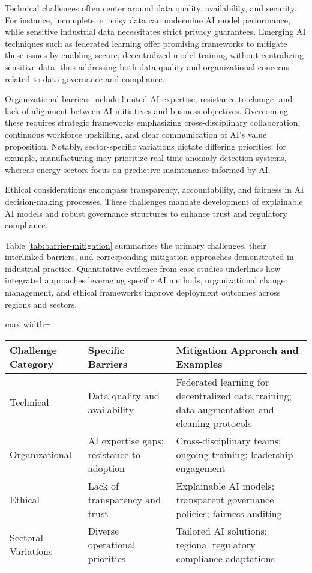 \documentclass[sigconf]{acmart}
\begin{document}
Technical challenges often center around data quality, availability, and security. For instance, incomplete or noisy data can undermine AI model performance, while sensitive industrial data necessitates strict privacy guarantees. Emerging AI techniques such as federated learning offer promising frameworks to mitigate these issues by enabling secure, decentralized model training without centralizing sensitive data, thus addressing both data quality and organizational concerns related to data governance and compliance.

Organizational barriers include limited AI expertise, resistance to change, and lack of alignment between AI initiatives and business objectives. Overcoming these requires strategic frameworks emphasizing cross-disciplinary collaboration, continuous workforce upskilling, and clear communication of AI’s value proposition. Notably, sector-specific variations dictate differing priorities; for example, manufacturing may prioritize real-time anomaly detection systems, whereas energy sectors focus on predictive maintenance informed by AI.

Ethical considerations encompass transparency, accountability, and fairness in AI decision-making processes. These challenges mandate development of explainable AI models and robust governance structures to enhance trust and regulatory compliance.

Table \ref{tab:barrier-mitigation} summarizes the primary challenges, their interlinked barriers, and corresponding mitigation approaches demonstrated in industrial practice. Quantitative evidence from case studies underlines how integrated approaches leveraging specific AI methods, organizational change management, and ethical frameworks improve deployment outcomes across regions and sectors.

\begin{table*}[htbp]
\centering
\caption{Integrated Challenges and Mitigation Approaches for Industrial AI Deployment}
\label{tab:barrier-mitigation}
\begin{adjustbox}{max width=\textwidth}
\begin{tabular}{@{}lll@{}}
\toprule
\textbf{Challenge Category} & \textbf{Specific Barriers} & \textbf{Mitigation Approach and Examples} \\ \midrule
Technical & Data quality and availability & Federated learning for decentralized data training; data augmentation and cleaning protocols \\
Organizational & AI expertise gaps; resistance to adoption & Cross-disciplinary teams; ongoing training; leadership engagement \\
Ethical & Lack of transparency and trust & Explainable AI models; transparent governance policies; fairness auditing \\
Sectoral Variations & Diverse operational priorities & Tailored AI solutions; regional regulatory compliance adaptations \\ \bottomrule
\end{tabular}
\end{adjustbox}
\end{table*}
\end{document}
